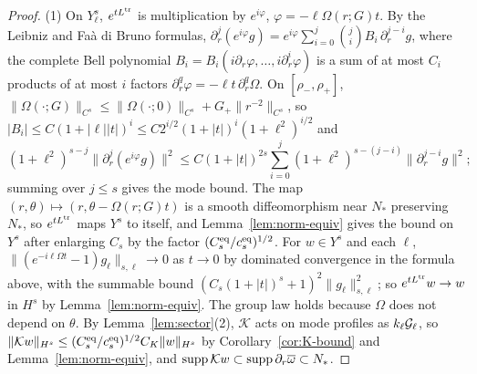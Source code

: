 \begin{proof}
(1) On $Y^s_\ell$, $e^{tL^{\rm tr}}$ is multiplication by $e^{i\varphi}$,
$\varphi=-\ell\Omega(r;G)t$. By the Leibniz and Fa\`a di Bruno formulas,
$\partial_r^j(e^{i\varphi}g)=e^{i\varphi}\sum_{i=0}^{j}\binom jiB_i\,\partial_r^{j-i}g$,
where the complete Bell polynomial $B_i=B_i(i\partial_r\varphi,\dots,i\partial_r^i\varphi)$ is a sum
of at most $C_i$ products of at most $i$ factors $\partial_r^q\varphi=-\ell t\,\partial_r^q\Omega$.
On $[\rho_-,\rho_+]$,
$\|\Omega(\cdot;G)\|_{C^s}\le\|\Omega(\cdot;0)\|_{C^s}+G_+\|r^{-2}\|_{C^s}$, so
$|B_i|\le C(1+|\ell||t|)^i\le C2^{i/2}(1+|t|)^i(1+\ell^2)^{i/2}$ and
\[
(1+\ell^2)^{s-j}\|\partial_r^j(e^{i\varphi}g)\|^2\le C(1+|t|)^{2s}\sum_{i=0}^{j}(1+\ell^2)^{s-(j-i)}\|\partial_r^{j-i}g\|^2;
\]
summing over $j\le s$ gives the mode bound. The map
$(r,\theta)\mapsto(r,\theta-\Omega(r;G)t)$ is a smooth diffeomorphism near $N_*$
preserving $N_*$, so $e^{tL^{\rm tr}}$ maps $Y^s$ to itself, and
Lemma~\ref{lem:norm-equiv} gives the bound on $Y^s$ after enlarging $C_s$ by the
factor $(C^{\rm eq}_s/c^{\rm eq}_s)^{1/2}$. For $w\in Y^s$ and each $\ell$,
$\|(e^{-i\ell\Omega t}-1)g_\ell\|_{s,\ell}\to0$ as $t\to0$ by dominated convergence in
the formula above, with the summable bound $(C_s(1+|t|)^s+1)^2\|g_\ell\|^2_{s,\ell}$;
so $e^{tL^{\rm tr}}w\to w$ in $H^s$ by Lemma~\ref{lem:norm-equiv}. The group law
holds because $\Omega$ does not depend on $\theta$. By Lemma~\ref{lem:sector}(2),
$\mathcal K$ acts on mode profiles as $k_\ell\mathcal{G}_\ell$, so
$\|\mathcal Kw\|_{H^s}\le(C^{\rm eq}_s/c^{\rm eq}_s)^{1/2}C_K\|w\|_{H^s}$ by
Corollary~\ref{cor:K-bound} and Lemma~\ref{lem:norm-equiv}, and
$\operatorname{supp}\mathcal Kw\subset\operatorname{supp}\partial_r\overline{\omega}\subset N_*$.


\end{proof}
